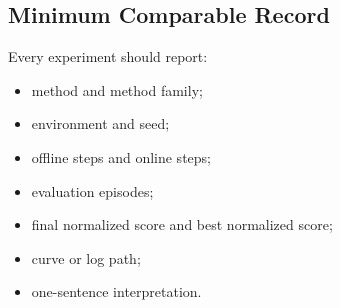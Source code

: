 \subsection{Minimum Comparable Record}

Every experiment should report:

\begin{itemize}[leftmargin=*]
  \item method and method family;
  \item environment and seed;
  \item offline steps and online steps;
  \item evaluation episodes;
  \item final normalized score and best normalized score;
  \item curve or log path;
  \item one-sentence interpretation.
\end{itemize}
